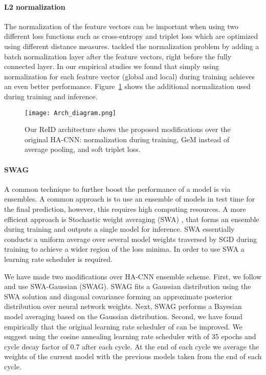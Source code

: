 \documentclass[sigconf]{acmart}
\begin{document}
\paragraph{L2 normalization}
The normalization of the feature vectors can be important when using two different loss functions such as cross-entropy and triplet loss which are optimized using different distance measures. \cite{luo2019bag} tackled the normalization problem by adding a batch normalization layer after the feature vectors, right before the fully connected layer. In our empirical studies we found that simply using  normalization for each feature vector (global and local) during training achieves an even better performance.
Figure~\ref{fig:arch_diagram} shows the additional  normalization used during training and inference.

\begin{figure}
\centering
\texttt{[image: Arch\_diagram.png]}
\caption{Our ReID architecture shows the proposed modifications over the original HA-CNN:  normalization during training, GeM instead of average pooling, and soft triplet loss.}
\label{fig:arch_diagram}
\end{figure}


\paragraph{SWAG \cite{maddox2019simple}}
A common technique to further boost the performance of a model is via ensembles. A common approach is to use an ensemble of models in test time for the final prediction, however, this requires high computing resources.
A more efficient approach is Stochastic weight averaging (SWA) \cite{izmailov2018averaging}, that forms an ensemble during training and outputs a single model for inference. SWA essentially conducts a uniform average over several model weights traversed by SGD during training to achieve a wider region of the loss minima. In order to use SWA a learning rate scheduler is required.

We have made two modifications over HA-CNN ensemble scheme.
First, we follow \cite{maddox2019simple} and use SWA-Gaussian (SWAG). SWAG fits a Gaussian distribution using the SWA solution and diagonal covariance forming an approximate posterior distribution over neural network weights. Next, SWAG performs a Bayesian model averaging based on the Gaussian distribution.
Second, we have found empirically that the original learning rate scheduler of \cite{izmailov2018averaging} can be improved.
We suggest using the cosine annealing learning rate scheduler with  of 35 epochs and cycle decay factor of 0.7 after each cycle. At the end of each cycle we average the weights of the current model with the previous models taken from the end of each cycle.
\end{document}
